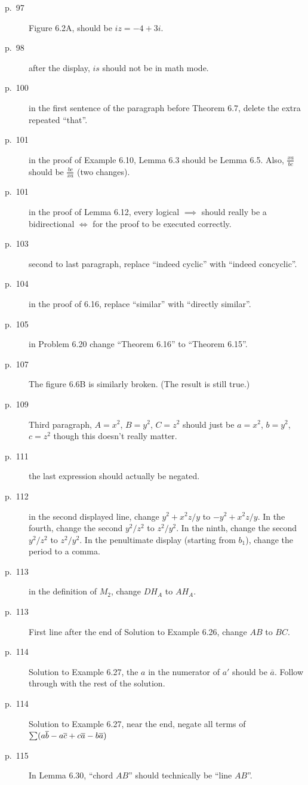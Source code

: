 \documentclass[11pt]{scrartcl}
\begin{document}
\begin{description}
\item[p.\  97] Figure 6.2A, should be $iz = -4+3i$.
\item[p.\  98] after the display, $is$ should not be in math mode.
\item[p.\  100] in the first sentence of the paragraph before Theorem 6.7,
  delete the extra repeated ``that''.
\item[p.\  101] in the proof of Example 6.10, Lemma 6.3 should be Lemma 6.5.
  Also, $\frac{xa}{bc}$ should be $\frac{bc}{xa}$ (two changes).
\item[p.\  101] in the proof of Lemma 6.12, every logical $\implies$ should
  really be a bidirectional $\iff$ for the proof to be executed correctly.
\item[p.\  103] second to last paragraph, replace ``indeed cyclic'' with ``indeed concyclic''.
\item[p.\  104] in the proof of 6.16, replace ``similar'' with ``directly similar''.
\item[p.\  105] in Problem 6.20 change ``Theorem 6.16'' to ``Theorem 6.15''.
\item[p.\  107] 
  The figure 6.6B is similarly broken.
  (The result is still true.)
\item[p.\  109] Third paragraph, $A=x^2$, $B=y^2$, $C=z^2$
  should just be $a=x^2$, $b=y^2$, $c=z^2$ though this doesn't really matter.
\item[p.\  111] the last expression should actually be negated.
\item[p.\  112] in the second displayed line, change $y^2+x^2z/y$ to $-y^2+x^2z/y$.
  In the fourth, change the second $y^2/z^2$ to $z^2/y^2$.
  In the ninth, change the second $y^2/z^2$ to $z^2/y^2$.
  In the penultimate display (starting from $b_1$), change the period to a comma.
\item[p.\  113] in the definition of $M_2$, change $DH_A$ to $AH_A$.
\item[p.\  113] First line after the end of Solution to Example 6.26,  change $AB$ to $BC$.
\item[p.\  114] Solution to Example 6.27, the $a$ in the numerator of $a'$ should be $\bar a$.
  Follow through with the rest of the solution.
\item[p.\  114] Solution to Example 6.27, near the end, negate all terms of
  $\sum (a \overline b - a \overline c + c \overline a - b \overline a)$
\item[p.\  115] In Lemma 6.30, ``chord $AB$'' should technically be ``line $AB$''.

\end{description}
\end{document}
